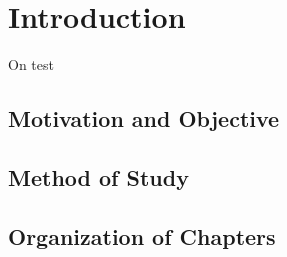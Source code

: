 
\ifpdf
\graphicspath{{Chapter1/Figs/Raster/}{Chapter1/Figs/PDF/}{Chapter1/Figs/}}
\else
\graphicspath{{Chapter1/Figs/Vector/}{Chapter1/Figs/}}
\fi

\chapter{Introduction}  %


On test

\section{Motivation and Objective} %

\section{Method of Study}  %

\section{Organization of Chapters}
